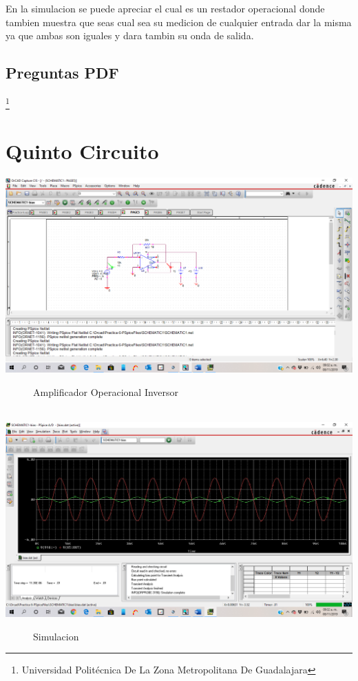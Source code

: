 \documentclass[10pt,a4paper]{article}
\begin{document}
En la simulacion se puede apreciar el cual es un restador operacional donde tambien muestra que seas cual sea su medicion de cualquier entrada dar la misma ya que ambas son iguales y dara tambin su onda de salida.







\subsection{Preguntas PDF}





\footnote{Universidad Politécnica De La Zona Metropolitana De Guadalajara} 

\newpage

\section{Quinto Circuito}
\begin{center}
 \includegraphics[scale=0.3]{9.png}
 \begin{figure}[hbtp]
 \caption{Amplificador Operacional Inversor}
 \centering
 \end{figure}\\
  \includegraphics[scale=0.3]{10.png}
 \begin{figure}[hbtp]
 \caption{Simulacion}
 \centering
 \end{figure} 
\end{center}
\end{document}
